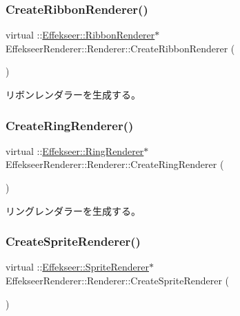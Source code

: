 \subsubsection{\texorpdfstring{Create\+Ribbon\+Renderer()}{CreateRibbonRenderer()}}
{\footnotesize\ttfamily virtual \+::\mbox{\hyperlink{class_effekseer_1_1_ribbon_renderer}{Effekseer\+::\+Ribbon\+Renderer}}$\ast$ Effekseer\+Renderer\+::\+Renderer\+::\+Create\+Ribbon\+Renderer (\begin{DoxyParamCaption}{ }\end{DoxyParamCaption})\hspace{0.3cm}{\ttfamily [pure virtual]}}



リボンレンダラーを生成する。 

\mbox{\label{class_effekseer_renderer_1_1_renderer_a84dec1c70cab5984ce151753b5c9bcb9}} 
\subsubsection{\texorpdfstring{Create\+Ring\+Renderer()}{CreateRingRenderer()}}
{\footnotesize\ttfamily virtual \+::\mbox{\hyperlink{class_effekseer_1_1_ring_renderer}{Effekseer\+::\+Ring\+Renderer}}$\ast$ Effekseer\+Renderer\+::\+Renderer\+::\+Create\+Ring\+Renderer (\begin{DoxyParamCaption}{ }\end{DoxyParamCaption})\hspace{0.3cm}{\ttfamily [pure virtual]}}



リングレンダラーを生成する。 

\mbox{\label{class_effekseer_renderer_1_1_renderer_abecf62202fe3d54f4edf6c43d701188b}} 
\subsubsection{\texorpdfstring{Create\+Sprite\+Renderer()}{CreateSpriteRenderer()}}
{\footnotesize\ttfamily virtual \+::\mbox{\hyperlink{class_effekseer_1_1_sprite_renderer}{Effekseer\+::\+Sprite\+Renderer}}$\ast$ Effekseer\+Renderer\+::\+Renderer\+::\+Create\+Sprite\+Renderer (\begin{DoxyParamCaption}{ }\end{DoxyParamCaption})\hspace{0.3cm}{\ttfamily [pure virtual]}}



